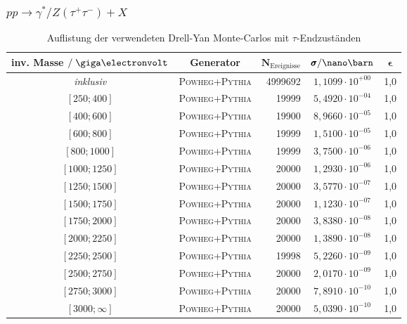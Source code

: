 \subsubsection*{$pp \rightarrow \gamma^*/Z(\tau^+\tau^-) + X$}
\begin{table}[h]
    \centering
    \begin{tabular}{|c|c|r|c|c|}
        \hline
        \bf{inv. Masse} $/\GeV$ & \bf{Generator} & $\pmb N_\text{Ereignisse}$ &
        $\pmb\sigma / \nano\barn$ & $\pmb\epsilon$ \\
        \hline \hline
        \textit{inklusiv} & \textsc{Powheg+Pythia} & 4999692 & $1,1099\cdot 10^{+00}$ & 1,0 \\
        $[250 ; 400]$     & \textsc{Powheg+Pythia} & 19999   & $5,4920\cdot 10^{-04}$ & 1,0 \\
        $[400 ; 600]$     & \textsc{Powheg+Pythia} & 19900   & $8,9660\cdot 10^{-05}$ & 1,0 \\
        $[600 ; 800]$     & \textsc{Powheg+Pythia} & 19999   & $1,5100\cdot 10^{-05}$ & 1,0 \\
        $[800 ; 1000]$    & \textsc{Powheg+Pythia} & 19999   & $3,7500\cdot 10^{-06}$ & 1,0 \\
        $[1000 ; 1250]$   & \textsc{Powheg+Pythia} & 20000   & $1,2930\cdot 10^{-06}$ & 1,0 \\
        $[1250 ; 1500]$   & \textsc{Powheg+Pythia} & 20000   & $3,5770\cdot 10^{-07}$ & 1,0 \\
        $[1500 ; 1750]$   & \textsc{Powheg+Pythia} & 20000   & $1,1230\cdot 10^{-07}$ & 1,0 \\
        $[1750 ; 2000]$   & \textsc{Powheg+Pythia} & 20000   & $3,8380\cdot 10^{-08}$ & 1,0 \\
        $[2000 ; 2250]$   & \textsc{Powheg+Pythia} & 20000   & $1,3890\cdot 10^{-08}$ & 1,0 \\
        $[2250 ; 2500]$   & \textsc{Powheg+Pythia} & 19998   & $5,2260\cdot 10^{-09}$ & 1,0 \\
        $[2500 ; 2750]$   & \textsc{Powheg+Pythia} & 20000   & $2,0170\cdot 10^{-09}$ & 1,0 \\
        $[2750 ; 3000]$   & \textsc{Powheg+Pythia} & 20000   & $7,8910\cdot 10^{-10}$ & 1,0 \\
        $[3000 ; \infty]$ & \textsc{Powheg+Pythia} & 20000   & $5,0390\cdot 10^{-10}$ & 1,0 \\
        \hline
    \end{tabular}
    \caption{Auflistung der verwendeten Drell-Yan Monte-Carlos mit $\tau$-Endzuständen} 
\end{table}
\FloatBarrier


